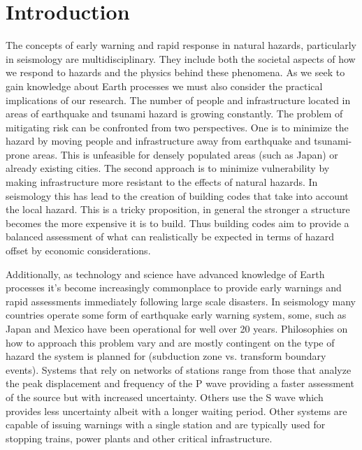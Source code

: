 
\chapter{Introduction}

The concepts of early warning and rapid response in natural hazards, particularly in seismology are multidisciplinary. They include both the societal aspects of how we respond to hazards and the physics behind these phenomena. As we seek to gain knowledge about Earth processes we must also consider the practical implications of our research. The number of people and infrastructure located in areas of earthquake and tsunami hazard is growing constantly. The problem of mitigating risk can be confronted from two perspectives. One is to minimize the hazard by moving people and infrastructure away from earthquake and tsunami-prone areas. This is unfeasible for densely populated areas (such as Japan) or already existing cities. The second approach is to minimize vulnerability by making infrastructure more resistant to the effects of natural hazards. In seismology this has lead to the creation of building codes that take into account the local hazard. This is a tricky proposition, in general the stronger a structure becomes the more expensive it is to build. Thus building codes aim to provide a balanced assessment of what can realistically be expected in terms of hazard offset by economic considerations.

Additionally, as technology and science have advanced knowledge of Earth processes it's become increasingly commonplace to provide early warnings and rapid assessments immediately following large scale disasters. In seismology many countries operate some form of earthquake early warning \citep{allen2009} system, some, such as Japan and Mexico have been operational for well over 20 years. Philosophies on how to approach this problem vary and are mostly contingent on the type of hazard the system is planned for (subduction zone vs. transform boundary events). Systems that rely on networks of stations range from those that analyze the peak displacement and frequency of the P wave \citep{kamigaichi2009} providing a faster assessment of the source but with increased uncertainty. Others use the S wave \citep{espinosa2009} which provides less uncertainty albeit with a longer waiting period. Other systems are capable of issuing warnings with a single station \citep{nakamura2007} and are typically used for stopping trains, power plants and other critical infrastructure.

